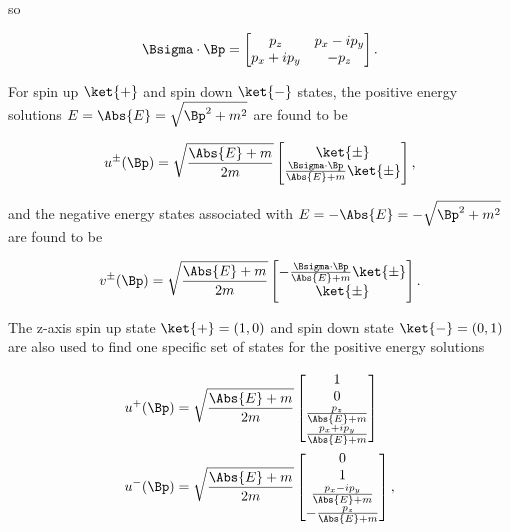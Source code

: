 so 

\begin{equation}\label{eqn:desaiDiracAdjoint:220}
\Bsigma \cdot \Bp =
\begin{bmatrix}
p_z &  p_x - i p_y \\
p_x + i p_y & - p_z
\end{bmatrix}.
\end{equation}

For spin up $\ket{+}$ and spin down $\ket{-}$ states, the positive energy solutions $E = \Abs{E} = \sqrt{\Bp^2 + m^2}$ are found to be

\begin{equation}\label{eqn:desaiDiracAdjoint:30}
u^{\pm}(\Bp) =
\sqrt{\frac{\Abs{E} + m}{2m}}
\begin{bmatrix}
\ket{\pm} \\
\frac{\Bsigma \cdot \Bp}{\Abs{E} + m} \ket{\pm}
\end{bmatrix},
\end{equation}

and the negative energy states associated with $E = -\Abs{E} = -\sqrt{\Bp^2 + m^2}$ are found to be

\begin{equation}\label{eqn:desaiDiracAdjoint:50}
v^{\pm}(\Bp) =
\sqrt{\frac{\Abs{E} + m}{2m}}
\begin{bmatrix}
-\frac{\Bsigma \cdot \Bp}{\Abs{E} + m} \ket{\pm} \\
\ket{\pm} \\
\end{bmatrix}.
\end{equation}

The z-axis spin up state $\ket{+} = (1, 0)$ and spin down state $\ket{-} = (0, 1)$ are also used to find one specific set of states for the positive energy solutions

\begin{subequations}
\begin{align}\label{eqn:desaiDiracAdjoint:70}
u^{+}(\Bp) &=
\sqrt{\frac{\Abs{E} + m}{2m}}
\begin{bmatrix}
1 \\
0 \\
\frac{p_z}{\Abs{E} + m} \\
\frac{p_x + i p_y}{\Abs{E} + m} \\
\end{bmatrix} \\
u^{-}(\Bp) &=
\sqrt{\frac{\Abs{E} + m}{2m}}
\begin{bmatrix}
0 \\
1 \\
\frac{p_x - i p_y}{\Abs{E} + m} \\
-\frac{p_z}{\Abs{E} + m} \\
\end{bmatrix},
\end{align}
\end{subequations}

